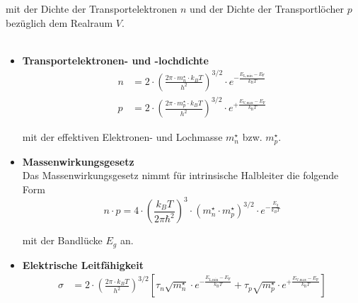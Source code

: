 \documentclass{article}
\newcommand{\lr}[1]{\left(#1\right)}
\newcommand{\lreck}[1]{\left[#1\right]}
\begin{document}
mit der Dichte der Transportelektronen $n$ und der Dichte der Transportlöcher $p$ bezüglich dem Realraum $V$.\\
\\
	\begin{itemize}
	\item \textbf{Transportelektronen- und -lochdichte}
		\begin{align}
			n &= 2 \cdot \lr{ \frac{2\pi \cdot m_n^\star \cdot k_B T}{h^2} }^{3/2} \cdot e^{-\frac{E_\text{L,min} - E_\text{F}}{k_\text{B}T}} \\
			p &= 2 \cdot \lr{ \frac{2\pi \cdot m_p^\star \cdot k_B T}{h^2} }^{3/2} \cdot e^{+\frac{E_\text{V,max} - E_\text{F}}{k_\text{B}T}}
		\end{align}

	mit der effektiven Elektronen- und Lochmasse $m_n^\star$ bzw. $m_p^\star$.
	
	
	\item \textbf{Massenwirkungsgesetz}\\
	Das Massenwirkungsgesetz nimmt für intrinsische Halbleiter die folgende Form
		\begin{equation}
			n \cdot p = 4 \cdot \lr{ \frac{k_BT}{2\pi\hbar^2} }^3 \cdot (m_n^\star \cdot m_p^\star)^{3/2} \cdot e^{-\frac{E_g}{k_BT}}
		\end{equation}
	
	mit der Bandlücke $E_g$ an.
	
	
	\item \textbf{Elektrische Leitfähigkeit}
		\begin{align}
			\sigma &= 2 \cdot \lr{ \frac{2\pi \cdot k_B T}{h^2} }^{3/2} \lreck{ \tau_n \sqrt{m_n^\star} \cdot e^{-\frac{E_\text{L,min} - E_\text{F}}{k_\text{B}T}} + \tau_p \sqrt{m_p^\star} \cdot e^{+\frac{E_\text{V,max} - E_\text{F}}{k_\text{B}T}} }
		\end{align}
	\end{itemize}

\newpage
\end{document}
